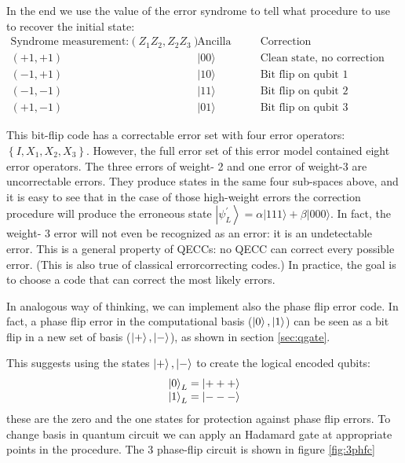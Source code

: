 In the end we use the value of the error syndrome to tell what procedure to use to recover the initial state:
\begin{equation*}
    \begin{array}{ccc}
        \text{Syndrome measurement:}
        (Z_1Z_2,Z_2Z_3) & \text{Ancilla state}& \text{Correction}\\
         (+1,+1) & |00\rangle & \text{Clean state, no correction needed }\\
(-1,+1) & |10\rangle & \text{Bit flip on qubit 1} \\
(-1,-1) & |11\rangle & \text{Bit flip on qubit 2}\\
(+1,-1) & |01\rangle  & \text{Bit flip on qubit 3}
    \end{array}
\end{equation*}

This bit-flip code has a correctable error set with four error operators: $\left\{I, X_{1}, X_{2}, X_{3}\right\}$. However, the full error set of this error model contained eight error operators. The three errors of weight- 2 and one error of weight-3 are uncorrectable errors. They produce states in the same four sub-spaces above, and it is easy to see that in the case of those high-weight errors the correction procedure will produce the erroneous state $\left|\psi_{L}^{\prime}\right\rangle=\alpha|111\rangle+\beta|000\rangle .$ In fact, the weight- 3 error will not even be recognized as an error: it is an undetectable error. This is a general property of QECCs: no QECC can correct every possible error. (This is also true of classical errorcorrecting codes.) In practice, the goal is to choose a code that can correct the most likely errors.

In analogous way of thinking, we can implement also the phase flip error code. In fact, a phase flip error in the computational basis ($\ket{0},\ket{1}$) can be seen as a bit flip in a new set of basis ($\ket{+},\ket{-}$), as shown in section \ref{sec:qgate}.

This suggests using the states $\ket{+},\ket{-}$ to create the logical encoded qubits: 
\begin{equation*}
    \begin{array}{c}
         \ket{0}_L=\ket{+++} \\
          \ket{1}_L=\ket{---}
    \end{array}
\end{equation*} these are the zero and the one states for protection against phase flip errors. 
To change basis in quantum circuit we can apply an Hadamard gate at appropriate points in the procedure.
The 3 phase-flip circuit is shown in figure \ref{fig:3phfc}


